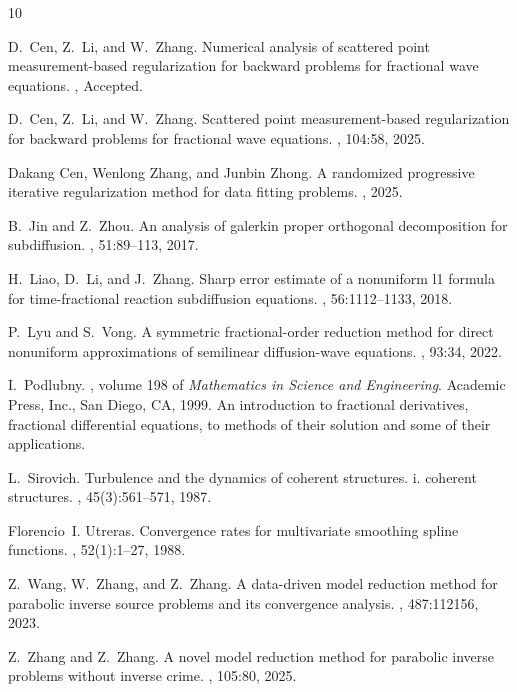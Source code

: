 \documentclass[11pt]{article}
\numberwithin{equation}{section}
\begin{document}
\begin{thebibliography}{10}

D.~Cen, Z.~Li, and W.~Zhang.
\newblock Numerical analysis of scattered point measurement-based
  regularization for backward problems for fractional wave equations.
, Accepted.

D.~Cen, Z.~Li, and W.~Zhang.
\newblock Scattered point measurement-based regularization for backward
  problems for fractional wave equations.
, 104:58, 2025.

Dakang Cen, Wenlong Zhang, and Junbin Zhong.
\newblock A randomized progressive iterative regularization method for data
  fitting problems.
, 2025.

B.~Jin and Z.~Zhou.
\newblock An analysis of galerkin proper orthogonal decomposition for
  subdiffusion.
,
  51:89--113, 2017.

H.~Liao, D.~Li, and J.~Zhang.
\newblock Sharp error estimate of a nonuniform l1 formula for time-fractional
  reaction subdiffusion equations.
, 56:1112--1133, 2018.

P.~Lyu and S.~Vong.
\newblock A symmetric fractional-order reduction method for direct nonuniform
  approximations of semilinear diffusion-wave equations.
, 93:34, 2022.

I.~Podlubny.
, volume 198 of {\em
  Mathematics in Science and Engineering}.
\newblock Academic Press, Inc., San Diego, CA, 1999.
\newblock An introduction to fractional derivatives, fractional differential
  equations, to methods of their solution and some of their applications.

L.~Sirovich.
\newblock Turbulence and the dynamics of coherent structures. i. coherent
  structures.
, 45(3):561--571, 1987.

Florencio~I. Utreras.
\newblock Convergence rates for multivariate smoothing spline functions.
, 52(1):1--27, 1988.

Z.~Wang, W.~Zhang, and Z.~Zhang.
\newblock A data-driven model reduction method for parabolic inverse source
  problems and its convergence analysis.
, 487:112156, 2023.

Z.~Zhang and Z.~Zhang.
\newblock A novel model reduction method for parabolic inverse problems without
  inverse crime.
, 105:80, 2025.

\end{thebibliography}
\end{document}

